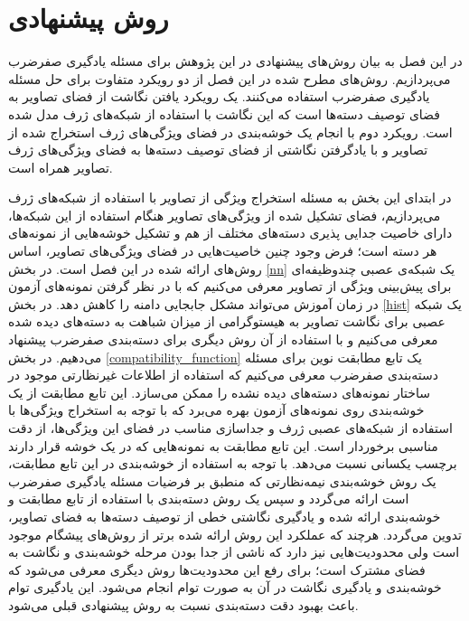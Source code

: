 \chapter{روش پیشنهادی} \label{chap:proposed}
در این فصل به بیان روش‌های پیشنهادی در این پژوهش برای مسئله یادگیری صفرضرب می‌پردازیم. روش‌های مطرح شده در این فصل از دو رویکرد متفاوت برای حل مسئله یادگیری صفرضرب استفاده می‌کنند. یک رویکرد یافتن نگاشت از فضای تصاویر به فضای توصیف دسته‌ها است که این نگاشت با استفاده از شبکه‌های ژرف مدل شده است. رویکرد دوم با انجام یک خوشه‌بندی در فضای ویژگی‌های ژرف استخراج شده از تصاویر و با یادگرفتن نگاشتی از فضای توصیف دسته‌ها به فضای ویژگی‌های ژرف تصاویر همراه است.

در ابتدای این بخش به مسئله استخراج ویژگی از تصاویر با استفاده از شبکه‌های ژرف می‌پردازیم، فضای تشکیل شده از ویژگی‌های تصاویر هنگام استفاده از این شبکه‌ها، دارای خاصیت جدایی پذیری دسته‌های مختلف از هم و تشکیل خوشه‌هایی از نمونه‌های هر دسته است؛ فرض وجود چنین خاصیت‌هایی در فضای ویژگی‌های تصاویر، اساس روش‌های ارائه شده در این فصل است.
در بخش \ref{nn} یک شبکه‌ی عصبی چندوظیفه‌ای برای پیش‌بینی ویژگی از تصاویر معرفی می‌کنیم که با در نظر گرفتن نمونه‌های آزمون در زمان آموزش می‌تواند مشکل جابجایی دامنه را کاهش دهد. در بخش \ref{hist} یک شبکه عصبی برای نگاشت تصاویر به هیستوگرامی از میزان شباهت به دسته‌های دیده شده معرفی می‌کنیم و با استفاده از آن روش دیگری برای دسته‌بندی صفرضرب پیشنهاد می‌دهیم.
در بخش
\ref{compatibility_function}
 یک تابع مطابقت نوین برای مسئله دسته‌بندی صفرضرب معرفی می‌کنیم که استفاده از اطلاعات غیرنظارتی موجود در ساختار نمونه‌های دسته‌های دیده نشده را ممکن می‌سازد. این تابع مطابقت از یک خوشه‌بندی روی نمونه‌های آزمون بهره می‌برد که با توجه به استخراج ویژگی‌ها با استفاده از شبکه‌های عصبی ژرف و جداسازی مناسب در فضای این ویژگی‌ها، از دقت مناسبی برخوردار است. این تابع مطابقت به نمونه‌هایی که در یک خوشه قرار دارند برچسب یکسانی نسبت می‌دهد. با توجه به استفاده از خوشه‌بندی در این تابع مطابقت، یک روش خوشه‌بندی نیمه‌نظارتی که منطبق بر فرضیات مسئله یادگیری صفرضرب است ارائه می‌گردد و سپس یک روش دسته‌بندی با استفاده از تابع مطابقت و خوشه‌بندی ارائه شده و یادگیری نگاشتی خطی از توصیف دسته‌ها به فضای تصاویر، تدوین می‌گردد. هرچند که عملکرد این روش ارائه شده برتر از روش‌های پیشگام موجود است ولی محدودیت‌هایی نیز دارد که ناشی از جدا بودن مرحله خوشه‌بندی و نگاشت به فضای مشترک است؛ برای رفع این محدودیت‌ها روش دیگری معرفی می‌شود که خوشه‌بندی و یادگیری نگاشت در آن به صورت توام انجام می‌شود. این یادگیری توام باعث بهبود دقت دسته‌بندی نسبت به روش پیشنهادی قبلی می‌شود.

